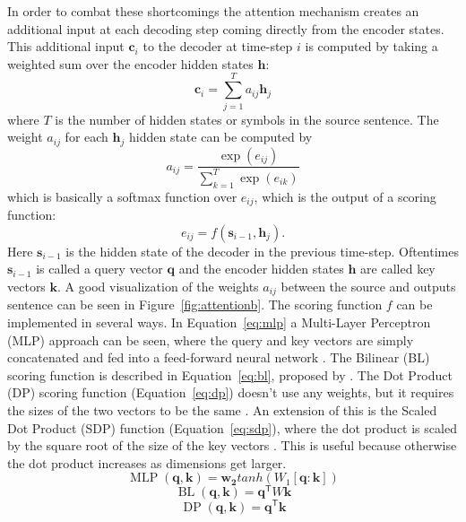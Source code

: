 \documentclass[12pt]{article}
\DeclareMathOperator{\MLP}{MLP}
\DeclareMathOperator{\DP}{DP}
\DeclareMathOperator{\BL}{BL}
\begin{document}
In order to combat these shortcomings the attention mechanism creates an additional input at each decoding step coming directly from the encoder states. This additional input \(\bm{c}_i\) to the decoder at time-step \(i\) is computed by taking a weighted sum over the encoder hidden states \(\bm{h}\):
\begin{equation} \label{eqattention}
\bm{c}_i=\sum_{j=1}^{T}a_{ij}\bm{h}_j
\end{equation}
where \(T\) is the number of hidden states or symbols in the source sentence. The weight \(a_{ij}\) for each \(\bm{h}_j\) hidden state can be computed by
\begin{equation}
a_{ij}=\frac{\exp(e_{ij})}{\sum_{k=1}^{T}\exp(e_{ik})}
\end{equation}
which is basically a softmax function over \(e_{ij}\), which is the output of a scoring function:
\begin{equation}
e_{ij}=f(\bm{s}_{i-1},\bm{h}_j).
\end{equation}
Here \(\bm{s}_{i-1}\) is the hidden state of the decoder in the previous time-step. Oftentimes \(\bm{s}_{i-1}\) is called a query vector \(\bm{q}\) and the encoder hidden states \(\bm{h}\) are called key vectors \(\bm{k}\). A good visualization of the weights \(a_{ij}\) between the source and outputs sentence can be seen in Figure~\ref{fig:attentionb}. The scoring function \(f\) can be implemented in several ways. In Equation~\ref{eq:mlp} a Multi-Layer Perceptron (MLP) approach can be seen, where the query and key vectors are simply concatenated and fed into a feed-forward neural network \cite{Bahdanau:2014}. The Bilinear (BL) scoring function is described in Equation~\ref{eq:bl}, proposed by \cite{Luong:2015}. The Dot Product (DP) scoring function (Equation~\ref{eq:dp}) doesn't use any weights, but it requires the sizes of the two vectors to be the same \cite{Luong:2015}. An extension of this is the Scaled Dot Product (SDP) function (Equation~\ref{eq:sdp}), where the dot product is scaled by the square root of the size of the key vectors \cite{Vaswani:2017}. This is useful because otherwise the dot product increases as dimensions get larger.
\begin{equation} \label{eq:mlp}
\MLP(\bm{q},\bm{k})=\bm{w_2}tanh(W_1[\bm{q}:\bm{k}])
\end{equation}
\begin{equation} \label{eq:bl}
\BL(\bm{q},\bm{k})=\bm{q}^\mathsf{T}W\bm{k}
\end{equation}
\begin{equation} \label{eq:dp}
\DP(\bm{q},\bm{k})=\bm{q}^\mathsf{T}\bm{k}
\end{equation}
\end{document}

